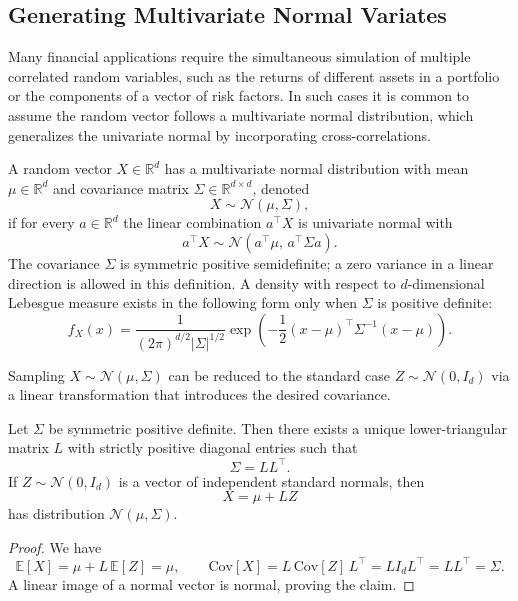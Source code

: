 \subsection{Generating Multivariate Normal Variates} 

Many financial applications require the simultaneous simulation of multiple correlated random variables, such as the returns of different assets in a portfolio or the components of a vector of risk factors. 
In such cases it is common to assume the random vector follows a multivariate normal distribution, which generalizes the univariate normal by incorporating cross-correlations.

\begin{definition}
A random vector \( X \in \mathbb{R}^d \) has a multivariate normal distribution with mean \(\mu \in \mathbb{R}^d\) and covariance matrix \(\Sigma \in \mathbb{R}^{d \times d}\), denoted
\[
X \sim \mathcal{N}(\mu, \Sigma),
\]
if for every \(a \in \mathbb{R}^d\) the linear combination \(a^\top X\) is univariate normal with
\[
a^\top X \sim \mathcal{N}(a^\top \mu,\, a^\top \Sigma a).
\]
The covariance $\Sigma$ is symmetric positive semidefinite; a zero
variance in a linear direction is allowed in this definition. A
density with respect to $d$-dimensional Lebesgue measure exists in
the following form only when $\Sigma$ is positive definite:
\[
f_X(x) = \frac{1}{(2\pi)^{d/2}|\Sigma|^{1/2}}
\exp\!\left(-\frac{1}{2}(x - \mu)^\top \Sigma^{-1} (x - \mu)\right).
\]
\end{definition}

\noindent
Sampling \( X \sim \mathcal{N}(\mu, \Sigma) \) can be reduced to the standard case \( Z \sim \mathcal{N}(0, I_d) \) via a linear transformation that introduces the desired covariance.

\begin{theorem}
Let \(\Sigma\) be symmetric positive definite.
Then there exists a unique lower-triangular matrix $L$ with strictly
positive diagonal entries such that
\[
\Sigma = L L^\top.
\]
If \(Z \sim \mathcal{N}(0, I_d)\) is a vector of independent standard normals, then
\[
X = \mu + LZ
\]
has distribution \(\mathcal{N}(\mu, \Sigma)\).
\end{theorem}

\begin{proof}
We have
\[
\mathbb{E}[X] = \mu + L\,\mathbb{E}[Z] = \mu, \qquad
\mathrm{Cov}[X] = L\,\mathrm{Cov}[Z]\,L^\top = L I_d L^\top = LL^\top = \Sigma.
\]
A linear image of a normal vector is normal, proving the claim.
\end{proof}



